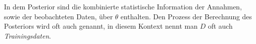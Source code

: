 \documentclass{report}
\theoremstyle{linebreak}
\begin{document}
In dem Posterior sind die kombinierte statistische Information der Annahmen, sowie der beobachteten Daten, über $\theta$ enthalten. Den Prozess der Berechnung des Posteriors wird oft auch  genannt, in diesem Kontext nennt man $D$ oft auch \textit{Trainingsdaten}. 


\nocite{*}


\end{document}
